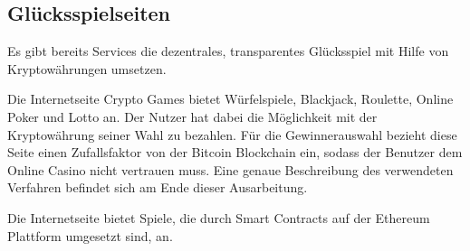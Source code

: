 
\subsection{Glücksspielseiten}


Es gibt bereits Services die dezentrales, transparentes Glücksspiel mit Hilfe von Kryptowährungen umsetzen.

Die Internetseite Crypto Games \cite{crypto_games} bietet Würfelspiele, Blackjack, Roulette, Online Poker und Lotto an. Der Nutzer hat dabei die Möglichkeit mit der Kryptowährung seiner Wahl zu bezahlen. Für die Gewinnerauswahl bezieht diese Seite einen Zufallsfaktor von der Bitcoin Blockchain ein, sodass der Benutzer dem Online Casino nicht vertrauen muss.
Eine genaue Beschreibung des verwendeten Verfahren befindet sich am Ende dieser Ausarbeitung.

Die Internetseite \cite{vdice} bietet Spiele, die durch Smart Contracts auf der Ethereum Plattform umgesetzt sind, an.